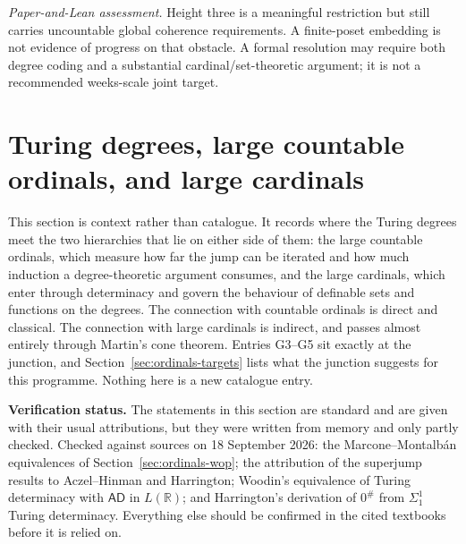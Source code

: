 \documentclass[11pt,a4paper]{article}
\newcommand{\assessment}[1]{\par\noindent\textit{Paper-and-Lean assessment.} #1\par}
\theoremstyle{definition}\newtheorem{definition}[theorem]{Definition}
\theoremstyle{remark}\newtheorem{remark}[theorem]{Remark}
\begin{document}
\assessment{Height three is a meaningful restriction but still carries uncountable global coherence requirements. A finite-poset embedding is not evidence of progress on that obstacle. A formal resolution may require both degree coding and a substantial cardinal/set-theoretic argument; it is not a recommended weeks-scale joint target.}



\section{Turing degrees, large countable ordinals, and large cardinals}
\label{sec:ordinals}
This section is context rather than catalogue. It records where the Turing degrees meet the two hierarchies that lie on either side of them: the large countable ordinals, which measure how far the jump can be iterated and how much induction a degree-theoretic argument consumes, and the large cardinals, which enter through determinacy and govern the behaviour of definable sets and functions on the degrees. The connection with countable ordinals is direct and classical. The connection with large cardinals is indirect, and passes almost entirely through Martin's cone theorem. Entries G3--G5 sit exactly at the junction, and Section~\ref{sec:ordinals-targets} lists what the junction suggests for this programme. Nothing here is a new catalogue entry.

\noindent\colorbox{pale}{\parbox{\dimexpr\textwidth-2\fboxsep\relax}{\small
\textbf{Verification status.} The statements in this section are standard and are given with their usual attributions, but they were written from memory and only partly checked. Checked against sources on 18 September 2026: the Marcone--Montalb\'an equivalences of Section~\ref{sec:ordinals-wop}; the attribution of the superjump results to Aczel--Hinman and Harrington; Woodin's equivalence of Turing determinacy with $\mathsf{AD}$ in $L(\mathbb R)$; and Harrington's derivation of $0^\#$ from $\Sigma^1_1$ Turing determinacy. Everything else should be confirmed in the cited textbooks \cite{SacksHRT,Simpson,Kanamori} before it is relied on.}}
\end{document}
